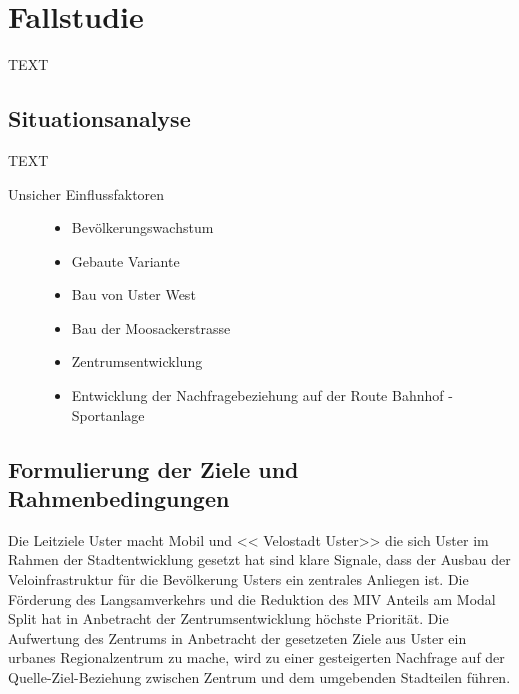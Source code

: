 %
%
%
%

\chapter{Fallstudie}
\label{chap:Fallstudie}

TEXT

\section{Situationsanalyse}
\label{sec:Situation}

TEXT
\begin{description}
\item[Unsicher Einflussfaktoren]\hfill %
\begin{itemize}
\item Bevölkerungswachstum
\item Gebaute Variante
\item Bau von Uster West
\item Bau der Moosackerstrasse
\item Zentrumsentwicklung
\item Entwicklung der Nachfragebeziehung auf der Route Bahnhof - Sportanlage
\end{itemize}
\end{description}


\section{Formulierung der Ziele und Rahmenbedingungen}
\label{sec:Zielformulierung}

Die Leitziele \guillemotleft Uster macht Mobil \guillemotright und << Velostadt Uster>> die sich Uster im Rahmen der Stadtentwicklung gesetzt hat sind klare Signale, dass der Ausbau der Veloinfrastruktur für die Bevölkerung Usters ein zentrales Anliegen ist. Die Förderung des Langsamverkehrs und die Reduktion des MIV Anteils am Modal Split hat in Anbetracht der Zentrumsentwicklung höchste Priorität. Die Aufwertung des Zentrums in Anbetracht der gesetzeten Ziele aus Uster ein urbanes Regionalzentrum zu mache, wird zu einer gesteigerten Nachfrage auf der Quelle-Ziel-Beziehung zwischen Zentrum und dem umgebenden Stadteilen führen.

